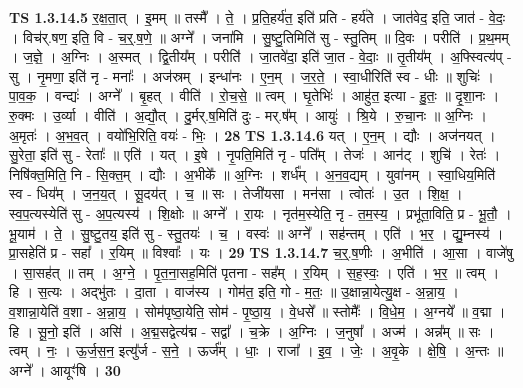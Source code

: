 \documentclass[17pt]{extarticle}
\begin{document}
                                \textbf{ TS 1.3.14.5} \newline
                  र॒क्ष॒ता॒त् । इ॒मम् ॥ तस्मै᳚ । ते॒ । प्र॒ति॒हर्य॑त॒ इति॑ प्रति - हर्य॑ते । जात॑वेद॒ इति॒ जात॑ - वे॒दः॒ । विच॑र्.षण॒ इति॒ वि - च॒र्॒.ष॒णे॒ ॥ अग्ने᳚ । जना॑मि । सु॒ष्टु॒तिमिति॑ सु - स्तु॒तिम् ॥ दि॒वः । परीति॑ । प्र॒थ॒मम् । ज॒ज्ञे॒ । अ॒ग्निः । अ॒स्मत् । द्वि॒तीय᳚म् । परीति॑॑ । जा॒तवे॑दा॒ इति॑ जा॒त - वे॒दाः॒ ॥ तृ॒तीय᳚म् । अ॒फ्स्वित्य॑प् - सु । नृ॒मणा॒ इति॑ नृ - मनाः᳚ । अज॑स्रम् । इन्धा॑नः । ए॒न॒म् । ज॒र॒ते॒ । स्वा॒धीरिति॑ स्व - धीः ॥ शुचिः॑ । पा॒व॒क॒ । वन्द्यः॑ । अग्ने᳚ । बृ॒हत् । वीति॑ । रो॒च॒से॒ ॥ त्वम् । घृ॒तेभिः॑ । आहु॑त॒ इत्या - हु॒तः॒ ॥ दृ॒शा॒नः । रु॒क्मः । उ॒र्व्या । वीति॑ । अ॒द्यौ॒त् । दु॒र्मर्.ष॒मिति॑ दुः - मर्.ष᳚म् । आयुः॑ । श्रि॒ये । रु॒चा॒नः ॥ अ॒ग्निः । अ॒मृतः॑ । अ॒भ॒व॒त् । वयो॑भि॒रिति॒ वयः॑ - भिः॒ । \textbf{  28} \newline
                  \newline
                                \textbf{ TS 1.3.14.6} \newline
                  यत् । ए॒न॒म् । द्यौः । अज॑नयत् । सु॒रेता॒ इति॑ सु - रेताः᳚ ॥ एति॑ । यत् । इ॒षे । नृ॒पति॒मिति॑ नृ - पति᳚म् । तेजः॑ । आन॑ट् । शुचि॑ । रेतः॑ । निषि॑क्त॒मिति॒ नि - सि॒क्त॒म् । द्यौः । अ॒भीके᳚ ॥ अ॒ग्निः । शर्ध᳚म् । अ॒न॒व॒द्यम् । युवा॑नम् । स्वा॒धिय॒मिति॑ स्व - धिय᳚म् । ज॒न॒य॒त् । सू॒दय॑त् । च॒ ॥ सः । तेजी॑यसा । मन॑सा । त्वोतः॑ । उ॒त । शि॒क्ष॒ । स्व॒प॒त्यस्येति॑ सु - अ॒प॒त्यस्य॑ । शि॒क्षोः ॥ अग्ने᳚ । रा॒यः । नृत॑म॒स्येति॒ नृ - त॒म॒स्य॒ । प्रभू॑ता॒विति॒ प्र - भू॒तौ॒ । भू॒याम॑ । ते॒ । सु॒ष्टु॒तय॒ इति॑ सु - स्तु॒तयः॑ । च॒ । वस्वः॑ ॥ अग्ने᳚ । सह॑न्तम् । एति॑ । भ॒र॒ । द्यु॒म्नस्य॑ । प्रा॒सहेति॑ प्र - सहा᳚ । र॒यिम् ॥ विश्वाः᳚ । यः । \textbf{  29} \newline
                  \newline
                                \textbf{ TS 1.3.14.7} \newline
                  च॒र्॒.ष॒णीः । अ॒भीति॑ । आ॒सा । वाजे॑षु । सा॒सह॑त् ॥ तम् । अ॒ग्ने॒ । पृ॒त॒ना॒सह॒मिति॑ पृतना - सह᳚म् । र॒यिम् । स॒ह॒स्वः॒ । एति॑ । भ॒र॒ ॥ त्वम् । हि । स॒त्यः । अद्भु॑तः । दा॒ता । वाज॑स्य । गोम॑त॒ इति॒ गो - म॒तः॒ ॥ उ॒क्षान्ना॒येत्यु॒क्ष - अ॒न्ना॒य॒ । व॒शान्ना॒येति॑ व॒शा - अ॒न्ना॒य॒ । सोम॑पृष्ठा॒येति॒ सोम॑ - पृ॒ष्ठा॒य॒ । वे॒धसे᳚ ॥ स्तोमैः᳚ । वि॒धे॒म॒ । अ॒ग्नये᳚ ॥ व॒द्मा । हि । सू॒नो॒ इति॑ । असि॑ । अ॒द्म॒सद्वेत्य॑द्म - सद्वा᳚ । च॒क्रे । अ॒ग्निः । ज॒नुषा᳚ । अज्म॑ । अन्न᳚म् ॥ सः । त्वम् । नः॒ । ऊ॒र्ज॒स॒न॒ इत्यु᳚र्ज - स॒ने॒ । ऊर्ज᳚म् । धाः॒ । राजा᳚ । इ॒व॒ । जेः॒ । अ॒वृ॒के । क्षे॒षि॒ । अ॒न्तः ॥ अग्ने᳚ । आयूꣳ॑षि । \textbf{  30} \newline
\end{document}
